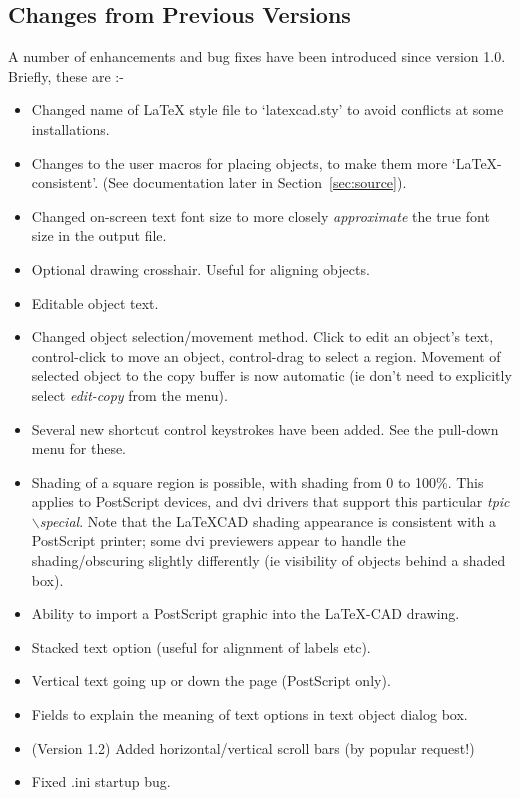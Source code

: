 \documentclass[a4paper]{article}
\newcommand{\bs}{$\backslash$}
\begin{document}
\subsection{Changes from Previous Versions}
A number of enhancements and bug fixes have been introduced
since version 1.0. Briefly, these are :-
\begin{itemize}
	\item Changed name of \LaTeX\/ style file to `latexcad.sty' to
		avoid conflicts at some installations.
	\item Changes to the user macros for placing objects, to make them
		more `\LaTeX-consistent'. (See documentation later
		in Section~\ref{sec:source}).
	\item Changed on-screen text font size to more closely
		\textit{approximate} the true font size in the output file.
	\item Optional drawing crosshair. Useful for aligning objects.
	\item Editable object text.
	\item Changed object selection/movement method.  Click to
		edit an object's text, control-click to move an object,
		control-drag to select a region. Movement of selected
		object to the copy buffer is now automatic (ie don't
		need to explicitly select \textit{edit-copy} from the menu).
	\item Several new shortcut control keystrokes have been added.
		See the pull-down menu for these.
	\item Shading of a square region is possible, with shading from
		0 to 100\%. This applies to PostScript devices, and \textsf{dvi}
		drivers that support this particular \textit{tpic \bs special}.
		Note that the LaTeXCAD shading appearance is consistent
		with a PostScript printer; some \textsf{dvi} previewers appear to
		handle the shading/obscuring slightly differently
		(ie visibility of objects behind a shaded box).
	\item Ability to import a PostScript graphic into the LaTeX-CAD drawing.
	\item Stacked text option (useful for alignment of labels etc).
	\item Vertical text going up or down the page (PostScript only).
	\item Fields to explain the meaning of text options in text
		object dialog box.
	\item (Version 1.2) Added horizontal/vertical scroll bars (by popular request!)
	\item Fixed .ini startup bug.

\end{itemize}
\end{document}
